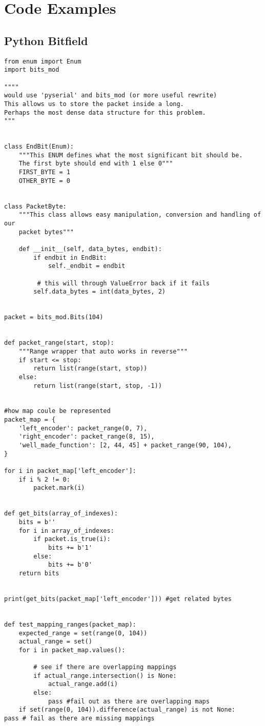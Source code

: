 \chapter{Code Examples}

\section{Python Bitfield}
\label{python_bitfield}
\begin{verbatim}
from enum import Enum
import bits_mod

""""
would use 'pyserial' and bits_mod (or more useful rewrite)
This allows us to store the packet inside a long. 
Perhaps the most dense data structure for this problem.
"""


class EndBit(Enum):
    """This ENUM defines what the most significant bit should be. 
    The first byte should end with 1 else 0"""
    FIRST_BYTE = 1
    OTHER_BYTE = 0


class PacketByte:
    """This class allows easy manipulation, conversion and handling of our 
    packet bytes"""

    def __init__(self, data_bytes, endbit):
        if endbit in EndBit:
            self._endbit = endbit

         # this will through ValueError back if it fails
        self.data_bytes = int(data_bytes, 2)  


packet = bits_mod.Bits(104)


def packet_range(start, stop):
    """Range wrapper that auto works in reverse"""
    if start <= stop:
        return list(range(start, stop))
    else:
        return list(range(start, stop, -1))


#how map coule be represented
packet_map = {
    'left_encoder': packet_range(0, 7),
    'right_encoder': packet_range(8, 15),
    'well_made_function': [2, 44, 45] + packet_range(90, 104),
}

for i in packet_map['left_encoder']:
    if i % 2 != 0:
        packet.mark(i)


def get_bits(array_of_indexes):
    bits = b''
    for i in array_of_indexes:
        if packet.is_true(i):
            bits += b'1'
        else:
            bits += b'0'
    return bits


print(get_bits(packet_map['left_encoder'])) #get related bytes


def test_mapping_ranges(packet_map):
    expected_range = set(range(0, 104))
    actual_range = set()
    for i in packet_map.values():
        
        # see if there are overlapping mappings
        if actual_range.intersection() is None: 
            actual_range.add(i)
        else:
            pass #fail out as there are overlapping maps
    if set(range(0, 104)).difference(actual_range) is not None:
pass # fail as there are missing mappings
\end{verbatim}


